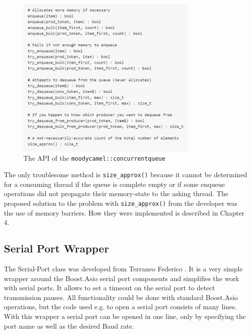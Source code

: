 \begin{figure}[h]
\centering
      \includegraphics[width=0.8\textwidth]{moody}
        \caption{The API of the \texttt{moodycamel::concurrentqueue}}
\end{figure}

The only troublesome method is \texttt{size\_approx()} because it cannot be determined for a consuming thread if the queue is complete empty or if some enqueue operations did not propagate their memory-state to the asking thread. The proposed solution to the problem with \texttt{size\_approx()} from the developer was the use of memory barriers. How they were implemented is described in Chapter 4.
\subsection{Serial Port Wrapper}
The Serial-Port class was developed from Terraneo Federico \cite{serport}. It is a very simple wrapper around the Boost.Asio serial port components and simplifies the work with serial ports. It allows to set a timeout on the serial port to detect transmission pauses. All functionality could be done with standard Boost.Asio operations, but the code used e.g. to open a serial port consists of many lines. With this wrapper a serial port can be opened in one line, only by specifying the port name as well as the desired Baud rate.